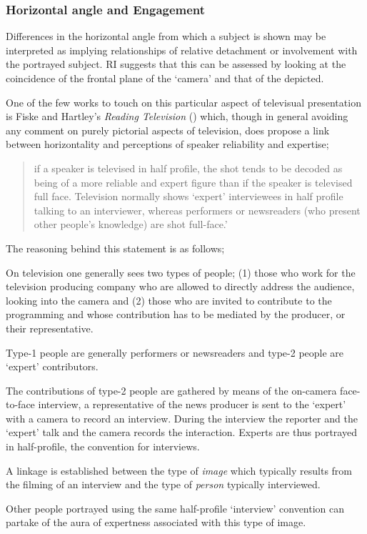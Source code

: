 \subsubsection{Horizontal angle and Engagement}

Differences in the horizontal angle from which a subject is shown may be interpreted as implying relationships of relative detachment or involvement with the portrayed subject. RI suggests that this can be assessed by looking at the coincidence of the frontal plane of the `camera' and that of the depicted.

One of the few works to touch on this particular aspect of televisual presentation is Fiske and Hartley's \emph{Reading Television} (\citeyear{Fiske:1978}) which, though in general avoiding any comment on purely pictorial aspects of television, does propose a link between horizontality and perceptions of speaker reliability and expertise;

\begin{quote}
if a speaker is televised in half profile, the shot tends to be decoded as being of a more reliable and expert figure than if the speaker is televised full face. Television normally shows `expert' interviewees in half profile talking to an interviewer, whereas performers or newsreaders (who present other people's knowledge) are shot full-face.' \citep[62]{Fiske:1978}
\end{quote}

The reasoning behind this statement is as follows;

\begin{close_enum}
\item On television one generally sees two types of people; (1) those who work for the television producing company who are allowed to directly address the audience, looking into the camera and (2) those who are invited to contribute to the programming and whose contribution has to be mediated by the producer, or their representative.
\item Type-1 people are generally performers or newsreaders and type-2 people are `expert' contributors.
\item The contributions of type-2 people are gathered by means of the on-camera face-to-face interview, a representative of the news producer is sent to the `expert' with a camera to record an interview. During the interview the reporter and the `expert' talk and the camera records the interaction. Experts are thus portrayed in half-profile, the convention for interviews.
\item A linkage is established between the type of \textit{image }which typically results from the filming of an interview and the type of \textit{person} typically interviewed.
\item Other people portrayed using the same half-profile `interview' convention can partake of the aura of expertness associated with this type of image.
\end{close_enum}

